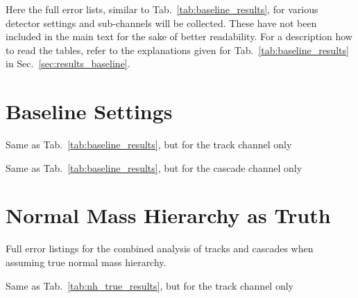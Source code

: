 Here the full error lists, similar to Tab.~\ref{tab:baseline_results}, for
various detector settings and sub-channels will be collected. These have
not been included in the main text for the sake of better readability. For a
description how to read the tables, refer to the explanations given for
Tab.~\ref{tab:baseline_results} in Sec.~\ref{sec:results_baseline}.

\section*{\label{app:fisher_baseline}\thesection\enskip
Baseline Settings}

\begin{table}[h!]
 \caption{Same as Tab.~\ref{tab:baseline_results}, but for the track channel
  only}
 \begin{center}
  \small{}
 \end{center}
\end{table}

\begin{table}[h!]
 \caption{Same as Tab.~\ref{tab:baseline_results}, but for the cascade channel
  only}
 \begin{center}
  \small{}
 \end{center}
\end{table}

\FloatBarrier
\section*{\label{app:fisher_nhtrue}
\thesection\enskip Normal Mass Hierarchy as Truth}

\begin{table}[h!]
 \caption{Full error listings for the combined analysis of tracks and cascades
  when assuming true normal mass hierarchy.}
 \label{tab:nh_true_results}
 \begin{center}
  \small{}
 \end{center}
\end{table}

\begin{table}[h!]
 \caption{Same as Tab.~\ref{tab:nh_true_results}, but for the track channel
  only}
 \begin{center}
  \small{}
 \end{center}
\end{table}

